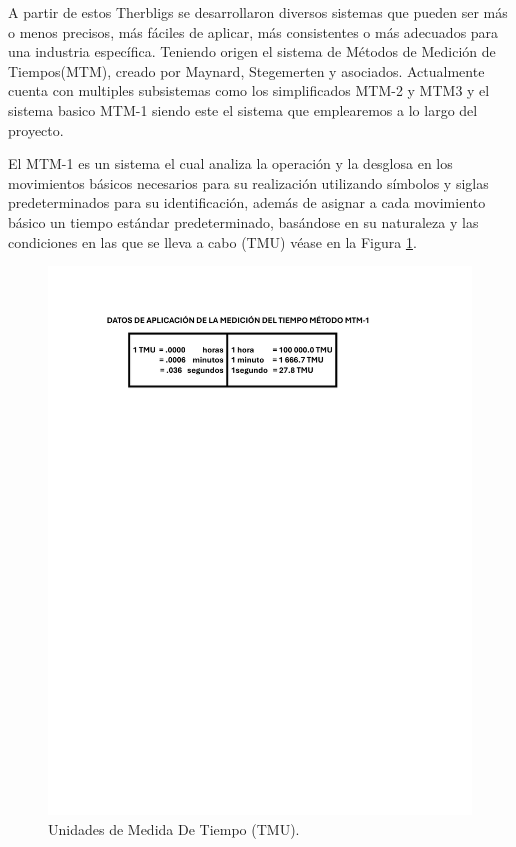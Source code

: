 A partir de estos Therbligs se desarrollaron diversos sistemas que pueden ser más o menos precisos, más fáciles de aplicar, más consistentes o más adecuados para una industria específica. Teniendo origen el sistema de Métodos de Medición de Tiempos(MTM), creado por Maynard, Stegemerten y asociados. Actualmente cuenta con multiples subsistemas como los simplificados MTM-2 y MTM3 y el sistema basico MTM-1 siendo este el sistema que emplearemos a lo largo del proyecto. 

El MTM-1 es un sistema el cual analiza la operación y la desglosa en los movimientos básicos necesarios para su realización utilizando símbolos y siglas predeterminados para su identificación, además de asignar a cada movimiento básico un tiempo estándar predeterminado, basándose en su naturaleza y las condiciones en las que se lleva a cabo (TMU) véase en la Figura \ref{fig:tablaTMU}.

\begin{figure}[H]
    \centering
    \includegraphics[scale=0.6]{15/img/tablaTMU.pdf}
    \caption{Unidades de Medida De Tiempo (TMU).}
    \label{fig:tablaTMU}
\end{figure}

